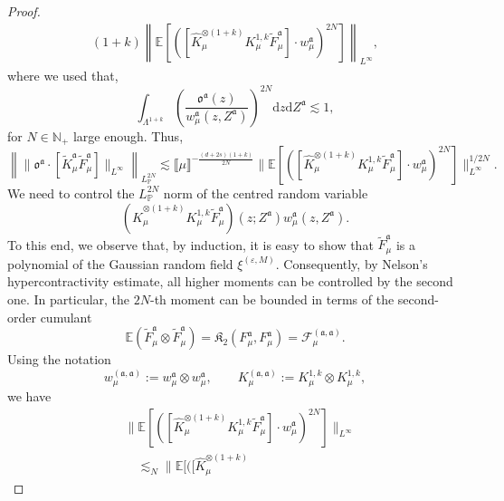 \documentclass{article}
\numberwithin{equation}{section}
\newcommand{\assign}{:=}
\newcommand{\mathd}{\mathrm{d}}
\theoremstyle{plain}
\theoremstyle{definition}
\begin{document}
\begin{proof}
\[\begin{aligned}
{       (1 + k)}
       \left\|
       \mathbb{E} [([\hat{K}^{\otimes (1 + k)}_{\mu} K_{\mu}^{1, k}
       \tilde{F}_{\mu}^{\mathfrak{a}}]
       \cdot w^{\mathfrak{a}}_{\mu})^{2 N}]
       \right\|_{L^{\infty}},
     \end{aligned} \]
  where we used that,
  \[ \int_{\Lambda^{1 + k}} {\left( \frac{\mathfrak{o}^{\mathfrak{a}}
     (z)}{w^{\mathfrak{a}}_{\mu} (z, Z^{\mathfrak{a}})} \right) }^{2 N} \mathd
     z \mathd Z^{\mathfrak{a}} \lesssim 1, \]
  for $N \in \mathbb{N}_+$ large enough. Thus,
  \begin{equation}
    \left\| \| \mathfrak{o}^{\mathfrak{a}} \cdot [\tilde{K}^{\mathfrak{a}}_{\mu}
    \tilde{F}_{\mu}^{\mathfrak{a}}] \|_{L^{\infty}}  \right\|_{L^{2 N}_{\mathbb{P}}}
    \lesssim \llbracket \mu \rrbracket^{- \frac{(d + 2 s) (1 +
    k)}{2 N} }  \| \mathbb{E} [([\hat{K}^{\otimes (1 +
    k)}_{\mu} K_{\mu}^{1, k} \tilde{F}_{\mu}^{\mathfrak{a}}] \cdot
    w^{\mathfrak{a}}_{\mu})^{2 N}] \|_{L^{\infty}}^{1 / 2 N} .
    \label{eq:steptwo-Fbound}
  \end{equation}
  We need to control the $L^{2 N}_{\mathbb{P}}$ norm of the centred random
  variable
  \[ (\hat{K}^{\otimes (1 + k)}_{\mu} K_{\mu}^{1, k}
     \tilde{F}_{\mu}^{\mathfrak{a}}) (z ; Z^{\mathfrak{a}})
     w^{\mathfrak{a}}_{\mu} (z, Z^{\mathfrak{a}}) . \]
  To this end, we observe that, by induction, it is easy to show that
  $\tilde{F}_{\mu}^{\mathfrak{a}}$ is a polynomial of the Gaussian random
  field $\xi^{(\varepsilon, M)}$. Consequently, by Nelson's hypercontractivity
  estimate, all higher moments can be controlled by the second one. In
  particular, the $2 N$-th moment can be bounded in terms of the second-order
  cumulant
  \[ \mathbb{E} (\tilde{F}_{\mu}^{\mathfrak{a}} \otimes
     \tilde{F}_{\mu}^{\mathfrak{a}}) =\mathfrak{K}_2 (F_{\mu}^{\mathfrak{a}},
     F_{\mu}^{\mathfrak{a}}) =\mathcal{F}^{(\mathfrak{a}, \mathfrak{a})}_{\mu} . \]
  Using the notation
  \[ w_{\mu}^{(\mathfrak{a}, \mathfrak{a})} \assign w_{\mu}^{\mathfrak{a}}
     \otimes w_{\mu}^{\mathfrak{a}}, \qquad
     K^{(\mathfrak{a}, \mathfrak{a})}_{\mu} \assign K_{\mu}^{1, k} \otimes
     K_{\mu}^{1, k}, \]
  we have
  \begin{equation}
    \begin{aligned}
      &\| \mathbb{E} [([\hat{K}^{\otimes (1 + k)}_{\mu} K_{\mu}^{1, k}
      \tilde{F}_{\mu}^{\mathfrak{a}}] \cdot w^{\mathfrak{a}}_{\mu})^{2 N}]
      \|_{L^{\infty}}\\
      &\quad \lesssim_N \| \mathbb{E} [([\hat{K}^{\otimes (1 + k)}_{\mu}

\end{aligned}
\end{equation}
\end{proof}
\end{document}
